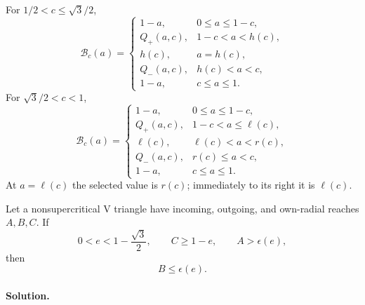 \begin{proposition}
\label{prop:app-four-direct-outputs}
For $1/2<c\le\sqrt3/2$,
\[
 \mathcal B_c(a)=
 \begin{cases}
  1-a,&0\le a\le1-c,\\
  Q_+(a,c),&1-c<a<h(c),\\
  h(c),&a=h(c),\\
  Q_-(a,c),&h(c)<a<c,\\
  1-a,&c\le a\le1.
 \end{cases}
\]
For $\sqrt3/2<c<1$,
\[
 \mathcal B_c(a)=
 \begin{cases}
  1-a,&0\le a\le1-c,\\
  Q_+(a,c),&1-c<a\le\ell(c),\\
  \ell(c),&\ell(c)<a<r(c),\\
  Q_-(a,c),&r(c)\le a<c,\\
  1-a,&c\le a\le1.
 \end{cases}
\]
At $a=\ell(c)$ the selected value is $r(c)$; immediately to its right it is
$\ell(c)$.
\end{proposition}

\begin{lemma}
\label{lem:app-direct-threshold}
Let a nonsupercritical V triangle have incoming, outgoing, and own-radial
reaches $A,B,C$.  If
\[
 0<e<1-\frac{\sqrt3}{2},
 \qquad C\ge1-e,
 \qquad A>\epsilon(e),
\]
then
\[
 B\le\epsilon(e).
\]
\end{lemma}

\paragraph{Solution.}

